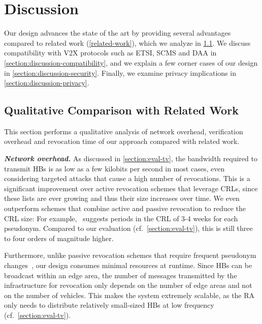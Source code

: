 \section{Discussion}
\label{chapter:discussion}

Our design advances the state of the art by providing several advantages
compared to related work (\cref{related-work}), which we analyze in
\cref{section:discussion-comparison}. %
We discuss compatibility with
\ac{V2X} protocols such as ETSI, SCMS and \ac{DAA} in
\cref{section:discussion-compatibility}, and we explain a few corner cases of
our design in \cref{section:discussion-security}. Finally, we examine privacy
implications in \cref{section:discussion-privacy}.

\subsection{Qualitative Comparison with Related Work}
\label{section:discussion-comparison}

This section performs a qualitative analysis of network overhead, verification
overhead and revocation time of our approach compared with related work.

\noindent\textbf{\emph{Network overhead.}}
%
As discussed in \cref{section:eval-tv}, the bandwidth required to transmit
\acp{HB} is as low as a few kilobits per second in most cases, even considering
targeted attacks that cause a high number of revocations. This is a significant
improvement over active revocation schemes that leverage \acp{CRL}, since these
lists are ever growing and thus their size increases over time. We even
outperform schemes that combine active and passive revocation to reduce the
\ac{CRL} size: For example,~\cite{simplicio2019acpc} suggests periods in the
\ac{CRL} of 3-4 weeks for each pseudonym. Compared to our evaluation
(cf.~\cref{section:eval-tv}), this is still three to four orders of magnitude
higher.

Furthermore, unlike passive revocation schemes that require frequent pseudonym
changes~\cite{hicks2020vehicular}, our design consumes minimal resources at
runtime. Since \acp{HB} can be broadcast within an edge area, the number of
messages transmitted by the infrastructure for revocation only depends on the
number of edge areas and not on the number of vehicles. This makes the system
extremely scalable, as the \ac{RA} only needs to distribute relatively
small-sized \acp{HB} at low frequency (cf.~\cref{section:eval-tv}).

